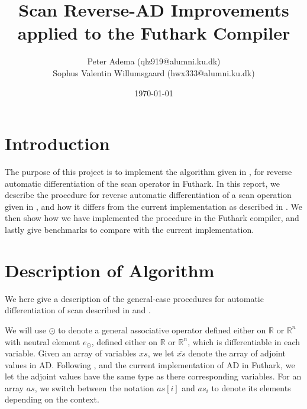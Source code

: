 \documentclass{article}
\title{Scan Reverse-AD Improvements applied to the Futhark Compiler}
\author{Peter Adema (qlz919@alumni.ku.dk)\\
Sophus Valentin Willumsgaard (hwx333@alumni.ku.dk)}
\date{\today}
\newcommand{\xs}{xs}
\newcommand{\xo}{\overline{xs}}
\begin{document}
\maketitle
\tableofcontents
\section{Introduction}
The purpose of this project is to implement the algorithm given in \cite{PPAD}, for reverse
automatic differentiation of the scan operator in Futhark.
In this report,
we describe the procedure for reverse automatic differentiation of a
scan operation given in \cite{PPAD},
and how it differs from the current implementation as described in
\cite{Futhark}.
We then show how we have implemented the procedure in the Futhark compiler,
and lastly give benchmarks to compare with the current implementation.
\section{Description of Algorithm}
We here give a description of the general-case procedures for automatic differentiation of
scan described in \cite{PPAD} and \cite{Futhark}.

We will use \(\odot\) to denote a general associative operator defined
either on \(\mathbb{R}\) or \(\mathbb{R}^{n}\) with neutral
element \(e_{\odot}\), defined either on \(\mathbb{R}\) or \(\mathbb{R}^{n}\),
which is differentiable in each variable.
Given an array of variables \(\xs\),
we let \(\xo\) denote the array of adjoint values in AD.
Following \cite{PPAD},
and the current implementation of AD in Futhark,
we let the adjoint values have the same type as there corresponding variables.
For an array \(as\),
we switch between the notation \(as[i]\) and \(as_{i}\) to denote its elements
depending on the context.
\end{document}

